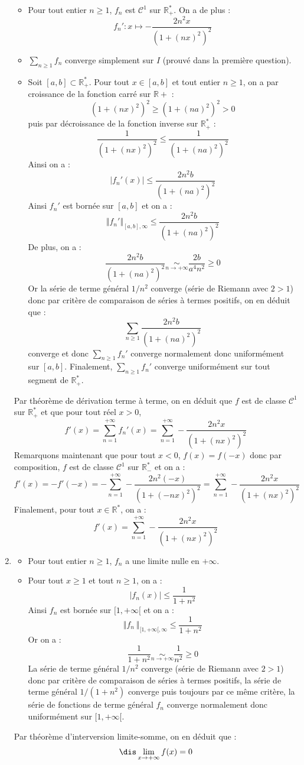 \documentclass[a4paper,10pt]{report}
\newcommand{\Sum}[2]{\ensuremath{\textstyle{\sum\limits_{#1}^{#2}}}}
\begin{document}
\begin{enumerate}
\begin{itemize}
\item Pour tout entier $n \geq 1$, $f_n$ est $\mathcal{C}^1$ sur $\mathbb{R}_+^{*}$. On a de plus :
$$f_n'  :  x\mapsto -\frac{2n^2x}{(1+(nx)^2)^2}$$
\item $\Sum{n \geq 1}{} f_n$ converge simplement sur $I$ (prouvé dans la première question).
\item Soit $[a,b]\subset \mathbb{R}_+^{*}$. Pour tout $x \in [a,b]$ et tout entier $n \geq 1$, on a par croissance de la fonction carré sur $\mathbb{R}+$ :
$$ (1+(nx)^2)^2 \geq (1+(na)^2)^2 >0$$
puis par décroissance de la fonction inverse sur $\mathbb{R}_+^{*}$ :
$$ \frac{1}{(1+(nx)^2)^2} \leq \frac{1}{(1+(na)^2)^2} $$
Ainsi on a :
$$ \vert f_n'(x) \vert \leq \frac{2n^2 b }{(1+(na)^2)^2}$$
Ainsi $f_n'$ est bornée sur $[a,b]$ et on a :
$$ \Vert f_n' \Vert_{[a,b], \infty} \leq  \frac{2n^2 b }{(1+(na)^2)^2}$$
De plus, on a :
$$ \frac{2n^2 b }{(1+(na)^2)^2} \underset{ n \rightarrow + \infty}{\sim} \frac{2b}{a^4n^2} \geq 0$$
Or la série de terme général $1/n^2$ converge (série de Riemann avec $2>1$) donc par critère de comparaison de séries à termes positifs, on en déduit que :
$$ \Sum{n \geq 1}{} \dfrac{2n^2 b }{(1+(na)^2)^2}$$
converge et donc $\Sum{n \geq 1}{} f_n'$ converge normalement donc uniformément sur $[a,b]$. Finalement, $\Sum{n \geq 1}{} f_n'$ converge uniformément sur tout segment de $\mathbb{R}_+^{*}$.
\end{itemize}
Par théorème de dérivation terme à terme, on en déduit que $f$ est de classe $\mathcal{C}^1$ sur $\mathbb{R}_+^*$ et que pour tout réel $x>0$,
$$f'(x) = \sum_{n=1}^{+\infty} f_n'(x) = \sum_{n=1}^{+\infty}  -\frac{2n^2x}{(1+(nx)^2)^2}$$
Remarquons maintenant que pour tout $x<0$, $f(x)=f(-x)$ donc par composition, $f$ est de classe $\mathcal{C}^1$ sur $\mathbb{R}_{-}^*$ et on a :
$$ f'(x) = -f'(-x) = -  \sum_{n=1}^{+\infty}  -\frac{2n^2(-x)}{(1+(-nx)^2)^2} =  \sum_{n=1}^{+\infty}  -\frac{2n^2x}{(1+(nx)^2)^2}$$
Finalement, pour tout $x \in \mathbb{R}^*$, on a :
$$f'(x)=  \sum_{n=1}^{+\infty}  -\frac{2n^2x}{(1+(nx)^2)^2}$$
\item 

 \begin{itemize}
\item  Pour tout entier $n \geq 1$, $f_n$ a une limite nulle en $+\infty$.
\item Pour tout $x \geq 1$ et tout $n \geq 1$, on a :
$$ \vert f_n(x) \vert \leq \frac{1}{1+n^2}$$
Ainsi $f_n$ est bornée sur $[1, + \infty[$ et on a :
$$ \Vert f_n\ \Vert_{[1,+\infty[, \infty}\leq \frac{1}{1+n^2} $$
Or on a :
$$ \frac{1}{1+n^2} \underset{n \rightarrow + \infty}{\sim} \frac{1}{n^2} \geq 0$$
La série de terme général $1/n^2$ converge (série de Riemann avec $2>1$) donc par critère de comparaison de séries à termes positifs, la série de terme général $1/(1+n^2)$ converge puis toujours par ce même critère, la série de fonctions de terme général $f_n$ converge normalement donc uniformément sur $[1, + \infty[$.
\end{itemize}
Par théorème d'interversion limite-somme, on en déduit que :
$$\dis \lim_{x\rightarrow+\infty}f(x)=0$$


\end{enumerate}
\end{document}
